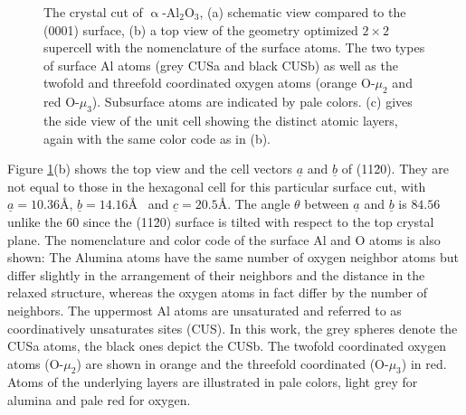 \documentclass[11pt,DIV=13,BCOR=5mm,a4paper,headinclude]{scrbook}
\renewcommand{\vec}[1]{\underline{#1}}
\begin{document}
\begin{figure}[!h]
             \caption{The crystal cut of $\upalpha$-Al$_2$O$_3$, (a) schematic view compared to the (0001) surface, (b) a top view of the geometry optimized $2\times 2$ supercell with the nomenclature of the surface atoms.
The two types of surface Al atoms (grey CUSa and black CUSb) as well as the twofold and threefold coordinated oxygen atoms (orange O-$\mu_2$ and red O-$\mu_3$).
Subsurface atoms are indicated by pale colors.
(c) gives the side view of the unit cell showing the distinct atomic layers, again with the same color code as in (b).}
            \label{abb:crystal_11-20}
\end{figure}
Figure \ref{abb:crystal_11-20}(b) shows the top view and the cell vectors $\vec{a}$ and $\vec{b}$ of (11\=20).
They are not equal to those in the hexagonal cell for this particular surface cut, with $\vec{a}=10.36$\AA, $\vec{b}=14.16$\AA~ and $\vec{c}=20.5$\AA.
The angle $\theta$ between $\vec{a}$ and $\vec{b}$ is $84.56$\textdegree{} unlike the $60$\textdegree{} since the (11\=20) surface is tilted with respect to the top crystal plane.
The nomenclature and color code of the surface Al and O atoms is also shown: The Alumina atoms have the same number of oxygen neighbor atoms but differ slightly in the arrangement of their neighbors and the distance in the relaxed structure, whereas the oxygen atoms in fact differ by the number of neighbors.
The uppermost Al atoms are unsaturated and referred to as coordinatively unsaturates sites (CUS).
In this work, the grey spheres denote the CUSa atoms, the black ones depict the CUSb.
The twofold coordinated oxygen atoms (O-$\mu_2$) are shown in orange and the threefold coordinated (O-$\mu_3$) in red.
Atoms of the underlying layers are illustrated in pale colors, light grey for alumina and pale red for oxygen.
\end{document}

